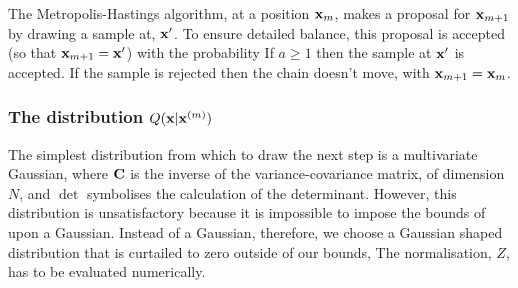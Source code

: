 The Metropolis-Hastings algorithm, at a position $\mathbf{x}_m$,
makes a proposal for $\mathbf{x}_{m+1}$ by drawing a sample at, $\mathbf{x}^\prime$.
To ensure detailed balance, this proposal is accepted (so that $\mathbf{x}_{m+1} = \mathbf{x}^\prime$)  with the probability 
If $a\ge1 $ then the sample at $\mathbf{x}^\prime$ is accepted. %
If the sample is rejected then the chain doesn't move, with $\mathbf{x}_{m+1} = \mathbf{x}_m$.

\subsubsection{The distribution  $Q(\mathbf{x}|\mathbf{x}^{(m)})$}

The simplest distribution from which to draw the next step 
is a multivariate Gaussian,
where $\mathbf{C}$ is the inverse of the variance-covariance matrix, of dimension $N$, and $\det$
 symbolises the calculation of the determinant.
However, this distribution is unsatisfactory because it is impossible to impose the
bounds of  upon a Gaussian.
Instead of a Gaussian, therefore,  we choose a Gaussian shaped distribution that is curtailed to zero outside of our bounds,
The normalisation, $Z$, has to be evaluated numerically.

